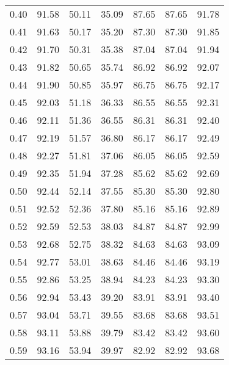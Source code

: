 \begin{tabular}{|c|c|c|c|c|c|c|}
      0.40 &     91.58 &     50.11 &      35.09 &   87.65 &      87.65 &         91.78 \\
      0.41 &     91.63 &     50.17 &      35.20 &   87.30 &      87.30 &         91.85 \\
      0.42 &     91.70 &     50.31 &      35.38 &   87.04 &      87.04 &         91.94 \\
      0.43 &     91.82 &     50.65 &      35.74 &   86.92 &      86.92 &         92.07 \\
      0.44 &     91.90 &     50.85 &      35.97 &   86.75 &      86.75 &         92.17 \\
      0.45 &     92.03 &     51.18 &      36.33 &   86.55 &      86.55 &         92.31 \\
      0.46 &     92.11 &     51.36 &      36.55 &   86.31 &      86.31 &         92.40 \\
      0.47 &     92.19 &     51.57 &      36.80 &   86.17 &      86.17 &         92.49 \\
      0.48 &     92.27 &     51.81 &      37.06 &   86.05 &      86.05 &         92.59 \\
      0.49 &     92.35 &     51.94 &      37.28 &   85.62 &      85.62 &         92.69 \\
      0.50 &     92.44 &     52.14 &      37.55 &   85.30 &      85.30 &         92.80 \\
      0.51 &     92.52 &     52.36 &      37.80 &   85.16 &      85.16 &         92.89 \\
      0.52 &     92.59 &     52.53 &      38.03 &   84.87 &      84.87 &         92.99 \\
      0.53 &     92.68 &     52.75 &      38.32 &   84.63 &      84.63 &         93.09 \\
      0.54 &     92.77 &     53.01 &      38.63 &   84.46 &      84.46 &         93.19 \\
      0.55 &     92.86 &     53.25 &      38.94 &   84.23 &      84.23 &         93.30 \\
      0.56 &     92.94 &     53.43 &      39.20 &   83.91 &      83.91 &         93.40 \\
      0.57 &     93.04 &     53.71 &      39.55 &   83.68 &      83.68 &         93.51 \\
      0.58 &     93.11 &     53.88 &      39.79 &   83.42 &      83.42 &         93.60 \\
      0.59 &     93.16 &     53.94 &      39.97 &   82.92 &      82.92 &         93.68 \\

\end{tabular}
